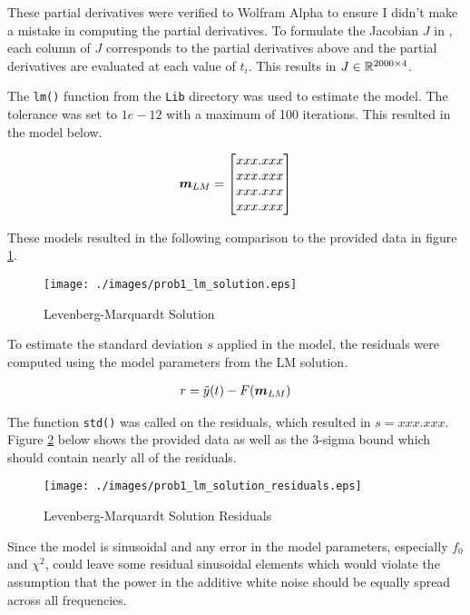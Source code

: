 These partial derivatives were verified to Wolfram Alpha to ensure I didn't make a mistake in computing the partial derivatives. To formulate the Jacobian $J$ in \MATLAB, each column of $J$ corresponds to the partial derivatives above and the partial derivatives are evaluated at each value of $t_i$. This results in $J \in \mathbb{R}^{2000 \times 4}$. 

The \verb|lm()| function from the \verb|Lib| directory was used to estimate the model. The tolerance was set to $1e-12$ with a maximum of 100 iterations. This resulted in the model below. 

\begin{align*}
	\boldsymbol{m}_{LM} = \begin{bmatrix} xxx.xxx \\ xxx.xxx \\ xxx.xxx \\ xxx.xxx \end{bmatrix}
\end{align*}

These models resulted in the following comparison to the provided data in figure \ref{fig: prob1 lm solution}. 

\begin{figure}[h] 
	\centering
	\texttt{[image: ./images/prob1\_lm\_solution.eps]}
	\caption{Levenberg-Marquardt Solution}
	\label{fig: prob1 lm solution}
\end{figure}
\FloatBarrier

To estimate the standard deviation $s$ applied in the model, the residuals were computed using the model parameters from the LM solution. 

\begin{align*}
	r = \tilde{y}(t) - F(\boldsymbol{m}_{LM})
\end{align*}

The \MATLAB function \verb|std()| was called on the residuals, which resulted in $s = xxx.xxx$. Figure \ref{fig: prob1 lm solution residuals} below shows the provided data as well as the 3-sigma bound which should contain nearly all of the residuals. 

\begin{figure}[h] 
	\centering
	\texttt{[image: ./images/prob1\_lm\_solution\_residuals.eps]}
	\caption{Levenberg-Marquardt Solution Residuals}
	\label{fig: prob1 lm solution residuals}
\end{figure}
\FloatBarrier

Since the model is sinusoidal and any error in the model parameters, especially $f_0$ and $\chi^2$, could leave some residual sinusoidal elements which would violate the assumption that the power in the additive white noise should be equally spread across all frequencies. 

